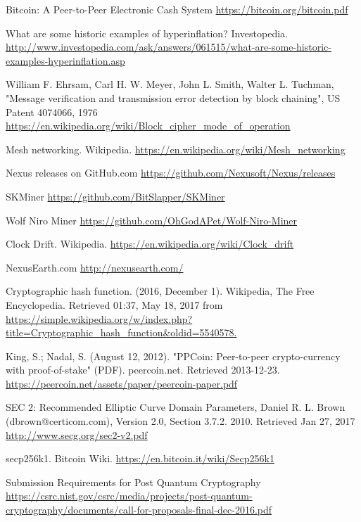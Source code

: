 \documentclass[11pt]{article}
\begin{document}
\pagebreak
\begin{thebibliography}{7}

Bitcoin: A Peer-to-Peer Electronic Cash System \url{https://bitcoin.org/bitcoin.pdf}

What are some historic examples of hyperinflation? Investopedia.
\url{http://www.investopedia.com/ask/answers/061515/what-are-some-historic-examples-hyperinflation.asp}

William F. Ehrsam, Carl H. W. Meyer, John L. Smith, Walter L. Tuchman, "Message verification and transmission error detection by block chaining", US Patent 4074066, 1976 \url{https://en.wikipedia.org/wiki/Block_cipher_mode_of_operation}

Mesh networking. Wikipedia.
\url{https://en.wikipedia.org/wiki/Mesh_networking}

Nexus releases on GitHub.com
\url{https://github.com/Nexusoft/Nexus/releases}

SKMiner
\url{https://github.com/BitSlapper/SKMiner}

Wolf Niro Miner
\url{https://github.com/OhGodAPet/Wolf-Niro-Miner}

Clock Drift. Wikipedia.
\url{https://en.wikipedia.org/wiki/Clock_drift}

NexusEarth.com
\url{http://nexusearth.com/}

Cryptographic hash function. (2016, December 1). Wikipedia, The Free Encyclopedia. Retrieved 01:37, May 18, 2017 from \url{https://simple.wikipedia.org/w/index.php?title=Cryptographic_hash_function&oldid=5540578.}

King, S.; Nadal, S. (August 12, 2012). "PPCoin: Peer-to-peer crypto-currency with proof-of-stake" (PDF). peercoin.net. Retrieved 2013-12-23. \url{https://peercoin.net/assets/paper/peercoin-paper.pdf}

SEC 2: Recommended Elliptic Curve Domain Parameters, Daniel R. L. Brown (dbrown@certicom.com), Version 2.0, Section 3.7.2. 2010. Retrieved Jan 27, 2017 \url{http://www.secg.org/sec2-v2.pdf}

secp256k1. Bitcoin Wiki.
\url{https://en.bitcoin.it/wiki/Secp256k1}

Submission Requirements for Post Quantum Cryptography
\url{https://csrc.nist.gov/csrc/media/projects/post-quantum-cryptography/documents/call-for-proposals-final-dec-2016.pdf}
 

\end{thebibliography}
\end{document}

